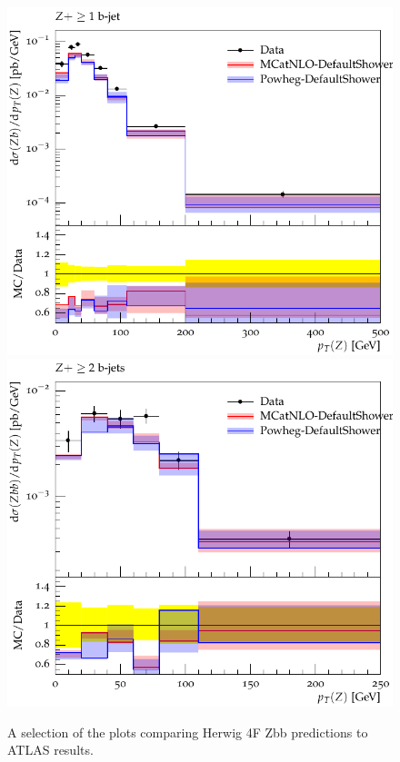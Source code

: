 \documentclass[11pt]{cernrep}
\begin{document}
\begin{figure}[htbp]
\begin{center}
   \includegraphics[scale=0.65]{figs/zbb/herwig4F/d15-x01-y01.pdf} 
   \includegraphics[scale=0.65]{figs/zbb/herwig4F/d25-x01-y01.pdf} 
\caption{A selection of the plots comparing Herwig 4F Zbb predictions to ATLAS results.}
\label{zbb-herwig4F-atlas}
\end{center}
\end{figure}
\end{document}
